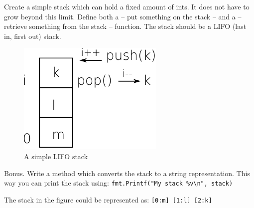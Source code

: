 \begin{Exercise}[title={Stack},difficulty=5]
\label{ex:stack}
\Question \label{ex:stack q1} Create a simple stack which can hold a
fixed amount of ints. It does not have to grow beyond this limit.
Define both a  -- put something on the stack -- and a  
-- retrieve something from the stack -- function. The stack should be
a LIFO (last in, first out) stack.

\begin{figure}[H]
\caption{A simple LIFO stack}
\label{fig:stack}
\begin{center}
\includegraphics[scale=0.65]{fig/stack.pdf}
\end{center}
\end{figure}

\Question \label{ex:stack q2} Bonus. Write a  method which 
converts the stack to a string representation.  This way you can print the stack using:
\lstinline{fmt.Printf("My stack %v\n", stack)}

\noindent{}The stack in the figure could be represented as:
\texttt{[0:m] [1:l] [2:k]}

\end{Exercise}

